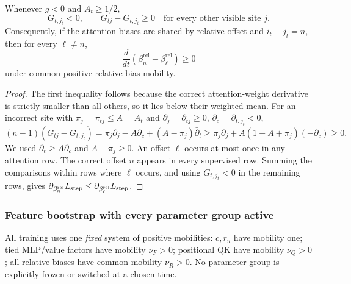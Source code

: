 \begin{lrlemma}
\label{lem:lr-postrouting-gradient}
Whenever $g<0$ and $A_t\ge1/2$,
\begin{equation}\label{eq:lr-score-comparison}
 G_{t,j_t}<0,\qquad G_{tj}-G_{t,j_t}\ge0
 \quad\text{for every other visible site }j.
\end{equation}
Consequently, if the attention biases are shared by relative offset and
$i_t-j_t=n$, then for every $\ell\ne n$,
\begin{equation}\label{eq:lr-bias-gap-mono}
 \frac{d}{dt}
 (\beta_n^{\mathrm{rel}}-\beta_\ell^{\mathrm{rel}})\ge0
\end{equation}
under common positive relative-bias mobility.
\end{lrlemma}
\begin{proof}
The first inequality follows because the correct attention-weight
derivative is strictly smaller than all others, so it lies below their
weighted mean.  For an incorrect site with $\pi_j=\pi_{tj}\le A=A_t$ and
$\partial_j=\partial_{tj}\ge0$, $\partial_c=\partial_{t,j_t}<0$,
 $(n-1)(G_{tj}-G_{t,j_t}) =\pi_j\partial_j-A\partial_c+(A-\pi_j)\bar\partial_t \ge\pi_j\partial_j+A(1-A+\pi_j)(-\partial_c)\ge0.$ 
We used $\bar\partial_t\ge A\partial_c$ and $A-\pi_j\ge0$.
An offset $\ell$ occurs at most once in any attention row.  The correct
offset $n$ appears in every supervised row.  Summing the comparisons
within rows where $\ell$ occurs, and using $G_{t,j_t}<0$ in the
remaining rows, gives
$\partial_{\beta_n^{\mathrm{rel}}}L_{\mathrm{step}}
\le\partial_{\beta_\ell^{\mathrm{rel}}}L_{\mathrm{step}}$.
\end{proof}

\subsubsection{Feature bootstrap with every parameter group active}
\label{app:weak-routing-bootstrap}

All training uses one \emph{fixed} system of positive mobilities:
$c,r_u$ have mobility one; tied MLP/value factors have mobility
$\nu_F>0$; positional QK have mobility $\nu_Q>0$; all relative biases
have common mobility $\nu_R>0$.
No parameter group is explicitly frozen or switched at a chosen time.

